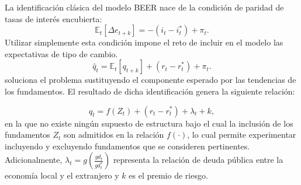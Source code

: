 \documentclass[12pt,letterpaper]{article}
\begin{document}
La identificación clásica del modelo BEER nace de la condición de paridad de tasas de interés encubierta:
\begin{equation}
\mathbb{E}_t[\Delta e_{t+k}]=-(i_t-i_t^*)+\pi_t.
\end{equation}
Utilizar simplemente esta condición impone el reto de incluir en el modelo las expectativas de tipo de cambio. 
\begin{equation}
\hat{q}_t=\mathbb{E}_t[q_{t+k}]+(r_t-r_t^*)+\pi_t.
\end{equation}
\cite{clark1999exchange} soluciona el problema sustituyendo el componente esperado por las tendencias de los fundamentos. El resultado de dicha identificación genera la siguiente relación:



\begin{equation}\label{qb}
q_t=f(Z_t)+(r_t-r_t^*)+\lambda_t+k,
\end{equation}
en la que no existe ningún supuesto de estructura bajo el cual la inclusión de los fundamentos $Z_t$ son admitidos en la relación $f(\cdot)$, lo cual permite experimentar incluyendo y excluyendo fundamentos que se consideren pertinentes. Adicionalmente, $\lambda_t=g(\frac{gd_t}{gd_t^*})$ representa la relación de deuda pública entre la economía local y el extranjero y $k$ es el premio de riesgo. 
\end{document}
